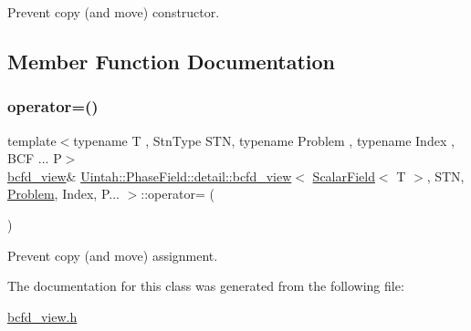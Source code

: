Prevent copy (and move) constructor. 



\subsection{Member Function Documentation}
\mbox{\label{classUintah_1_1PhaseField_1_1detail_1_1bcfd__view_3_01ScalarField_3_01T_01_4_00_01STN_00_01Problem_00_01Index_00_01P_8_8_8_01_4_a063e364cea3b9c346082797cc244392d}} 
\subsubsection{\texorpdfstring{operator=()}{operator=()}}
{\footnotesize\ttfamily template$<$typename T , Stn\+Type S\+TN, typename Problem , typename Index , B\+C\+F ... P$>$ \\
\hyperlink{classUintah_1_1PhaseField_1_1detail_1_1bcfd__view}{bcfd\+\_\+view}\& \hyperlink{classUintah_1_1PhaseField_1_1detail_1_1bcfd__view}{Uintah\+::\+Phase\+Field\+::detail\+::bcfd\+\_\+view}$<$ \hyperlink{structUintah_1_1PhaseField_1_1ScalarField}{Scalar\+Field}$<$ T $>$, S\+TN, \hyperlink{classUintah_1_1PhaseField_1_1Problem}{Problem}, Index, P... $>$\+::operator= (\begin{DoxyParamCaption}\item[{const \hyperlink{classUintah_1_1PhaseField_1_1detail_1_1bcfd__view}{bcfd\+\_\+view}$<$ \hyperlink{structUintah_1_1PhaseField_1_1ScalarField}{Scalar\+Field}$<$ T $>$, S\+TN, \hyperlink{classUintah_1_1PhaseField_1_1Problem}{Problem}, Index, P... $>$ \&}]{ }\end{DoxyParamCaption})\hspace{0.3cm}{\ttfamily [delete]}}



Prevent copy (and move) assignment. 



The documentation for this class was generated from the following file\+:\begin{DoxyCompactItemize}
\item 
\hyperlink{bcfd__view_8h}{bcfd\+\_\+view.\+h}\end{DoxyCompactItemize}
